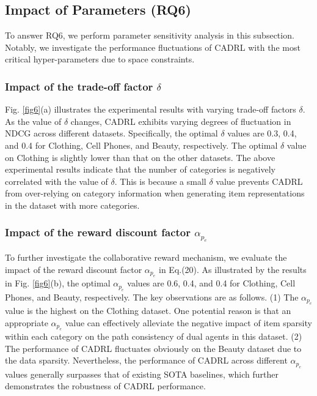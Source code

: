 \documentclass[conference]{IEEEtran}
\begin{document}
 


 \subsection{Impact of Parameters (RQ6)} 
To answer RQ6, we perform parameter sensitivity analysis in this subsection. Notably, we investigate the performance  fluctuations of CADRL with the most critical hyper-parameters due to space constraints.
  \subsubsection{Impact of the trade-off factor $\delta$}
Fig. \ref{fig6}(a) illustrates the experimental results with varying trade-off factors $\delta$. As the value of $\delta$ changes, CADRL exhibits varying degrees of fluctuation in NDCG across different datasets. Specifically, the optimal $\delta$  values are 0.3, 0.4, and 0.4 for Clothing, Cell Phones, and Beauty, respectively. The optimal  $\delta$ value on Clothing is slightly lower than that on the other datasets. The above experimental results indicate that the number of categories is negatively correlated with the value of $\delta$. This is because a small $\delta$ value prevents CADRL from over-relying on category information when generating item representations in the dataset with more categories. %





 \subsubsection{Impact of the reward discount factor $\alpha_{p_e}$}
To further investigate the collaborative reward mechanism, we evaluate the impact of the reward discount factor $\alpha_{p_e}$ in Eq.(20). As illustrated by the results in Fig. \ref{fig6}(b), the optimal $\alpha_{p_e}$ values are 0.6, 0.4, and 0.4 for Clothing, Cell Phones, and Beauty, respectively. The key observations are as follows. (1) The $\alpha_{p_e}$ value is the highest on the Clothing dataset. One potential reason is that an appropriate $\alpha_{p_e}$ value can effectively alleviate the negative impact of item sparsity within each category on the path consistency of dual agents in this dataset. (2) The performance of CADRL fluctuates obviously on the Beauty dataset due to the data sparsity.  Nevertheless, the performance of CADRL across different $\alpha_{p_e}$ values generally surpasses that of existing SOTA baselines, which further demonstrates the robustness of CADRL performance.
\end{document}
